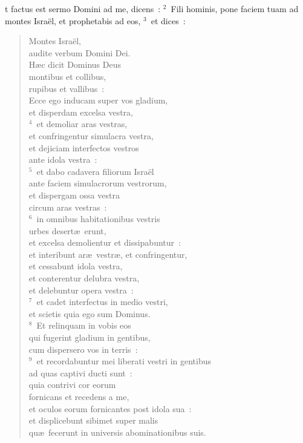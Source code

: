 \bchapter
{}t factus est sermo Domini ad me, dicens~:
${}^{2}$~Fili hominis, pone faciem tuam ad montes Isra\"el, et prophetabis ad eos,
${}^{3}$~et dices~: \begin{flushleft}\begin{verse}Montes Isra\"el,\\ audite verbum Domini Dei.\\ H\ae c dicit Dominus Deus\\ montibus et collibus,\\ rupibus et vallibus~:\\ Ecce ego inducam super vos gladium,\\ et disperdam excelsa vestra,\\
${}^{4}$~et demoliar aras vestras,\\ et confringentur simulacra vestra,\\ et dejiciam interfectos vestros\\ ante idola vestra~:\\
${}^{5}$~et dabo cadavera filiorum Isra\"el\\ ante faciem simulacrorum vestrorum,\\ et dispergam ossa vestra\\ circum aras vestras~:\\
${}^{6}$~in omnibus habitationibus vestris\\ urbes desert\ae\ erunt,\\ et excelsa demolientur et dissipabuntur~:\\ et interibunt ar\ae\ vestr\ae , et confringentur,\\ et cessabunt idola vestra,\\ et conterentur delubra vestra,\\ et delebuntur opera vestra~:\\
${}^{7}$~et cadet interfectus in medio vestri,\\ et scietis quia ego sum Dominus.\\
${}^{8}$~Et relinquam in vobis eos\\ qui fugerint gladium in gentibus,\\ cum dispersero vos in terris~:\\
${}^{9}$~et recordabuntur mei liberati vestri in gentibus\\ ad quas captivi ducti sunt~:\\ quia contrivi cor eorum\\ fornicans et recedens a me,\\ et oculos eorum fornicantes post idola sua~:\\ et displicebunt sibimet super malis\\ qu\ae\ fecerunt in universis abominationibus suis.\\

\end{verse}
\end{flushleft}
